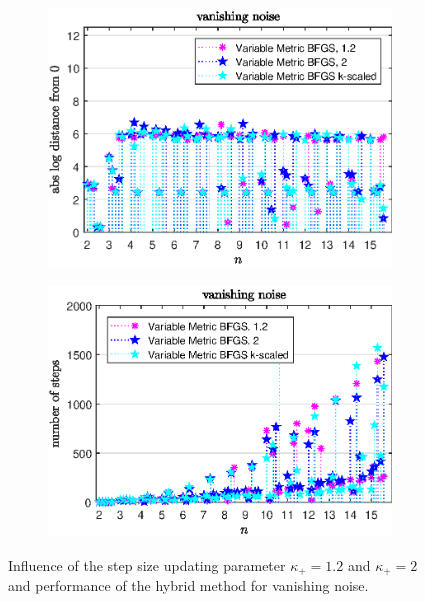 \vspace{-1.5em}

\begin{figure}[H]
	\begin{subfigure}{0.49\textwidth}
		\includegraphics[width=\textwidth]{Pictures/Plots/vanishing_noise_comp.eps}%
	\end{subfigure}
	\begin{subfigure}{0.49\textwidth}
		\includegraphics[width=\textwidth]{Pictures/Plots/steps_vanishing_noise_comp.eps}%
	\end{subfigure}
	\caption{Influence of the step size updating parameter \(\kappa_+ = 1.2\) and \(\kappa_+ =2 \) and performance of the hybrid method for vanishing noise.}%
	\label{fig_van_noise_comp}%
\end{figure}

